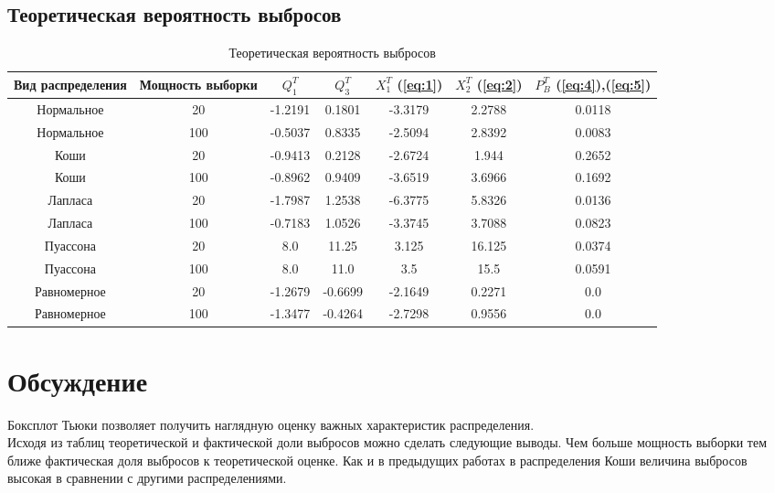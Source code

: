 \documentclass{article}
\begin{document}
\subsection{Теоретическая вероятность выбросов}
\begin{table} [hb]
\begin{center}
\begin{tabular}{|c|c|c|c|c|c|c|}
\hline 
Вид распределения & Мощность выборки & $Q_1^T$ & $Q_3^T$ & $X_1^T$ (\ref{eq:1})& $X_2^T$ (\ref{eq:2})& $P_B^T$ (\ref{eq:4}),(\ref{eq:5}) \\ 
\hline 
Нормальное & 20 & -1.2191 & 0.1801 & -3.3179 & 2.2788 & 0.0118 \\ 
\hline 
Нормальное & 100 & -0.5037 & 0.8335 & -2.5094 & 2.8392 & 0.0083 \\ 
\hline 
Коши & 20 & -0.9413 & 0.2128 & -2.6724 & 1.944 & 0.2652 \\ 
\hline 
Коши & 100 & -0.8962 & 0.9409 & -3.6519 & 3.6966 & 0.1692 \\ 
\hline 
Лапласа & 20 & -1.7987 & 1.2538 & -6.3775 & 5.8326 & 0.0136 \\ 
\hline 
Лапласа & 100 & -0.7183 & 1.0526 & -3.3745 & 3.7088 & 0.0823 \\ 
\hline 
Пуассона & 20 & 8.0 & 11.25 & 3.125 & 16.125 & 0.0374 \\ 
\hline 
Пуассона & 100 & 8.0 & 11.0 & 3.5 & 15.5 & 0.0591 \\ 
\hline 
Равномерное & 20 & -1.2679 & -0.6699 & -2.1649 & 0.2271 & 0.0 \\ 
\hline 
Равномерное & 100 & -1.3477 & -0.4264 & -2.7298 & 0.9556 & 0.0 \\ 
\hline 
\end{tabular} 
\caption{Теоретическая вероятность выбросов}
\end{center}
\end{table}

\newpage
\section{Обсуждение}
Боксплот Тьюки позволяет получить наглядную оценку важных характеристик распределения. \\
Исходя из таблиц теоретической и фактической доли выбросов можно сделать следующие выводы. Чем больше мощность выборки тем ближе фактическая доля выбросов к теоретической оценке. Как и в предыдущих работах в распределения Коши величина выбросов высокая в сравнении с другими распределениями.
\end{document}
